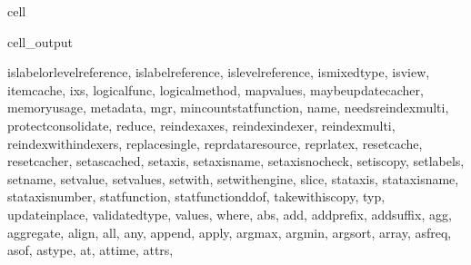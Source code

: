 \documentclass[letterpaper,10pt,english]{jupyterBook}
\begin{document}
\begin{sphinxuseclass}{cell}
\begin{sphinxVerbatimOutput}
\begin{sphinxuseclass}{cell_output}
\begin{sphinxVerbatim}[commandchars=\\\{\}]
\PYGZsq{}\PYGZus{}is\PYGZus{}label\PYGZus{}or\PYGZus{}level\PYGZus{}reference\PYGZsq{}, \PYGZsq{}\PYGZus{}is\PYGZus{}label\PYGZus{}reference\PYGZsq{}, \PYGZsq{}\PYGZus{}is\PYGZus{}level\PYGZus{}reference\PYGZsq{}, \PYGZsq{}\PYGZus{}is\PYGZus{}mixed\PYGZus{}type\PYGZsq{}, \PYGZsq{}\PYGZus{}is\PYGZus{}view\PYGZsq{}, \PYGZsq{}\PYGZus{}item\PYGZus{}cache\PYGZsq{}, \PYGZsq{}\PYGZus{}ixs\PYGZsq{}, \PYGZsq{}\PYGZus{}logical\PYGZus{}func\PYGZsq{}, \PYGZsq{}\PYGZus{}logical\PYGZus{}method\PYGZsq{}, \PYGZsq{}\PYGZus{}map\PYGZus{}values\PYGZsq{}, \PYGZsq{}\PYGZus{}maybe\PYGZus{}update\PYGZus{}cacher\PYGZsq{}, \PYGZsq{}\PYGZus{}memory\PYGZus{}usage\PYGZsq{}, \PYGZsq{}\PYGZus{}metadata\PYGZsq{}, \PYGZsq{}\PYGZus{}mgr\PYGZsq{}, \PYGZsq{}\PYGZus{}min\PYGZus{}count\PYGZus{}stat\PYGZus{}function\PYGZsq{}, \PYGZsq{}\PYGZus{}name\PYGZsq{}, \PYGZsq{}\PYGZus{}needs\PYGZus{}reindex\PYGZus{}multi\PYGZsq{}, \PYGZsq{}\PYGZus{}protect\PYGZus{}consolidate\PYGZsq{}, \PYGZsq{}\PYGZus{}reduce\PYGZsq{}, \PYGZsq{}\PYGZus{}reindex\PYGZus{}axes\PYGZsq{}, \PYGZsq{}\PYGZus{}reindex\PYGZus{}indexer\PYGZsq{}, \PYGZsq{}\PYGZus{}reindex\PYGZus{}multi\PYGZsq{}, \PYGZsq{}\PYGZus{}reindex\PYGZus{}with\PYGZus{}indexers\PYGZsq{}, \PYGZsq{}\PYGZus{}replace\PYGZus{}single\PYGZsq{}, \PYGZsq{}\PYGZus{}repr\PYGZus{}data\PYGZus{}resource\PYGZus{}\PYGZsq{}, \PYGZsq{}\PYGZus{}repr\PYGZus{}latex\PYGZus{}\PYGZsq{}, \PYGZsq{}\PYGZus{}reset\PYGZus{}cache\PYGZsq{}, \PYGZsq{}\PYGZus{}reset\PYGZus{}cacher\PYGZsq{}, \PYGZsq{}\PYGZus{}set\PYGZus{}as\PYGZus{}cached\PYGZsq{}, \PYGZsq{}\PYGZus{}set\PYGZus{}axis\PYGZsq{}, \PYGZsq{}\PYGZus{}set\PYGZus{}axis\PYGZus{}name\PYGZsq{}, \PYGZsq{}\PYGZus{}set\PYGZus{}axis\PYGZus{}nocheck\PYGZsq{}, \PYGZsq{}\PYGZus{}set\PYGZus{}is\PYGZus{}copy\PYGZsq{}, \PYGZsq{}\PYGZus{}set\PYGZus{}labels\PYGZsq{}, \PYGZsq{}\PYGZus{}set\PYGZus{}name\PYGZsq{}, \PYGZsq{}\PYGZus{}set\PYGZus{}value\PYGZsq{}, \PYGZsq{}\PYGZus{}set\PYGZus{}values\PYGZsq{}, \PYGZsq{}\PYGZus{}set\PYGZus{}with\PYGZsq{}, \PYGZsq{}\PYGZus{}set\PYGZus{}with\PYGZus{}engine\PYGZsq{}, \PYGZsq{}\PYGZus{}slice\PYGZsq{}, \PYGZsq{}\PYGZus{}stat\PYGZus{}axis\PYGZsq{}, \PYGZsq{}\PYGZus{}stat\PYGZus{}axis\PYGZus{}name\PYGZsq{}, \PYGZsq{}\PYGZus{}stat\PYGZus{}axis\PYGZus{}number\PYGZsq{}, \PYGZsq{}\PYGZus{}stat\PYGZus{}function\PYGZsq{}, \PYGZsq{}\PYGZus{}stat\PYGZus{}function\PYGZus{}ddof\PYGZsq{}, \PYGZsq{}\PYGZus{}take\PYGZus{}with\PYGZus{}is\PYGZus{}copy\PYGZsq{}, \PYGZsq{}\PYGZus{}typ\PYGZsq{}, \PYGZsq{}\PYGZus{}update\PYGZus{}inplace\PYGZsq{}, \PYGZsq{}\PYGZus{}validate\PYGZus{}dtype\PYGZsq{}, \PYGZsq{}\PYGZus{}values\PYGZsq{}, \PYGZsq{}\PYGZus{}where\PYGZsq{}, \PYGZsq{}abs\PYGZsq{}, \PYGZsq{}add\PYGZsq{}, \PYGZsq{}add\PYGZus{}prefix\PYGZsq{}, \PYGZsq{}add\PYGZus{}suffix\PYGZsq{}, \PYGZsq{}agg\PYGZsq{}, \PYGZsq{}aggregate\PYGZsq{}, \PYGZsq{}align\PYGZsq{}, \PYGZsq{}all\PYGZsq{}, \PYGZsq{}any\PYGZsq{}, \PYGZsq{}append\PYGZsq{}, \PYGZsq{}apply\PYGZsq{}, \PYGZsq{}argmax\PYGZsq{}, \PYGZsq{}argmin\PYGZsq{}, \PYGZsq{}argsort\PYGZsq{}, \PYGZsq{}array\PYGZsq{}, \PYGZsq{}asfreq\PYGZsq{}, \PYGZsq{}asof\PYGZsq{}, \PYGZsq{}astype\PYGZsq{}, \PYGZsq{}at\PYGZsq{}, \PYGZsq{}at\PYGZus{}time\PYGZsq{}, \PYGZsq{}attrs\PYGZsq{}, 
\end{sphinxVerbatim}
\end{sphinxuseclass}
\end{sphinxVerbatimOutput}
\end{sphinxuseclass}
\end{document}
